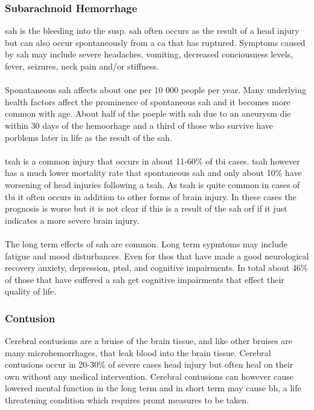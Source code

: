 \documentclass[11pt]{article}
\begin{document}
\subsubsection{Subarachnoid Hemorrhage}
\gls{sah} is the bleeding into the \gls{susp}. \gls{sah} often occurs as the result of a head injury but can also occur spontaneously from a \gls{ca} that has ruptured. Symptoms caused by \gls{sah} may include severe headaches, vomiting, decreased conciousness levels, fever, seizures, neck pain and/or stiffness.\cite{SubarachnoidHemorrhage2021}\\
\\
Sponataneous \gls{sah} affects about one per 10 000 people per year. Many underlying health factors affect the prominence of spontaneous \gls{sah} and it becomes more common with age. About half of the poeple with \gls{sah} due to an aneurysm die within 30 days of the hemoorhage and a third of those who survive have porblems later in life as the result of the \gls{sah}.\cite{SubarachnoidHemorrhage2021}\\
\\
\Gls{tsah} is a common injury that occurs in about 11-60\% of \gls{tbi} cases\cite{knipeTraumaticSubarachnoidHemorrhage}. \gls{tsah} however has a much lower mortality rate that spontaneous \gls{sah} and only about 10\% have worsening of head injuries following a \gls{tsah}\cite{cooperManagementTraumaticSubarachnoid2019}. As \gls{tsah} is quite common in cases of \gls{tbi} it often occurs in addition to other forms of brain injury. In these cases the prognosis is worse but it is not clear if this is a result of the \gls{sah} orf if it just indicates a more severe brain injury.\cite{SubarachnoidHemorrhage2021}\\
\\
The long term effects of \gls{sah} are common. Long term sypmtoms may include fatigue and mood disturbances. Even for thos that have made a good neurological recovery anxiety, depression, \gls{ptsd}, and cognitive impairments. In total about 46\% of those that have suffered a \gls{sah} get cognitive impairments that effect their quality of life.\cite{SubarachnoidHemorrhage2021}

\subsubsection{Contusion}
Cerebral contusions are a bruise of the brain tissue, and like other bruises are many microhemorrhages, that leak blood into the brain tissue. Cerebral contusions occur in 20-30\% of severe cases head injury but often heal on their own without any medical intervention. Cerebral contusions can however cause lowered mental function in the long term and in short term may cause \gls{bh}, a life threatening condition which requires promt measures to be taken\cite{BrainHerniation2020}.\cite{CerebralContusion2020}
\end{document}
